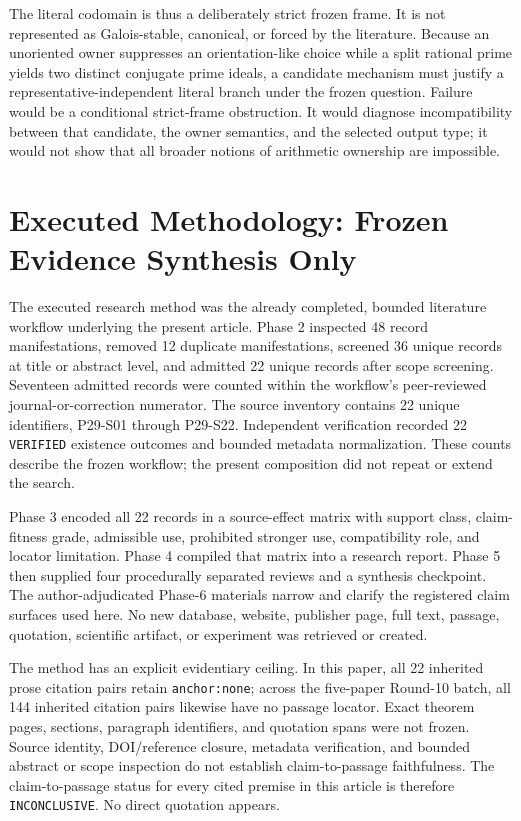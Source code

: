 \documentclass[11pt,a4paper]{article}
\begin{document}
The literal codomain is thus a deliberately strict frozen frame. It is not represented as Galois-stable, canonical, or forced by the literature. Because an unoriented owner suppresses an orientation-like choice while a split rational prime yields two distinct conjugate prime ideals, a candidate mechanism must justify a representative-independent literal branch under the frozen question. Failure would be a conditional strict-frame obstruction. It would diagnose incompatibility between that candidate, the owner semantics, and the selected output type; it would not show that all broader notions of arithmetic ownership are impossible.

\section{Executed Methodology: Frozen Evidence Synthesis Only}

The executed research method was the already completed, bounded literature workflow underlying the present article. Phase 2 inspected 48 record manifestations, removed 12 duplicate manifestations, screened 36 unique records at title or abstract level, and admitted 22 unique records after scope screening. Seventeen admitted records were counted within the workflow's peer-reviewed journal-or-correction numerator. The source inventory contains 22 unique identifiers, P29-S01 through P29-S22. Independent verification recorded 22 \texttt{VERIFIED} existence outcomes and bounded metadata normalization. These counts describe the frozen workflow; the present composition did not repeat or extend the search.

Phase 3 encoded all 22 records in a source-effect matrix with support class, claim-fitness grade, admissible use, prohibited stronger use, compatibility role, and locator limitation. Phase 4 compiled that matrix into a research report. Phase 5 then supplied four procedurally separated reviews and a synthesis checkpoint. The author-adjudicated Phase-6 materials narrow and clarify the registered claim surfaces used here. No new database, website, publisher page, full text, passage, quotation, scientific artifact, or experiment was retrieved or created.

The method has an explicit evidentiary ceiling. In this paper, all 22 inherited prose citation pairs retain \texttt{anchor:none}; across the five-paper Round-10 batch, all 144 inherited citation pairs likewise have no passage locator. Exact theorem pages, sections, paragraph identifiers, and quotation spans were not frozen. Source identity, DOI/reference closure, metadata verification, and bounded abstract or scope inspection do not establish claim-to-passage faithfulness. The claim-to-passage status for every cited premise in this article is therefore \texttt{INCONCLUSIVE}. No direct quotation appears.
\end{document}
